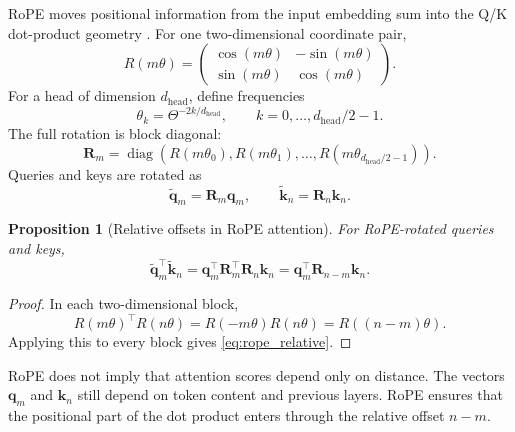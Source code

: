 \documentclass[11pt,a4paper]{article}
\theoremstyle{definition}
\theoremstyle{plain}
\newtheorem{proposition}{Proposition}[section]
\newcommand{\vq}{\bm{q}}
\newcommand{\vk}{\bm{k}}
\newcommand{\mR}{\bm{R}}
\newcommand{\dhead}{d_{\mathrm{head}}}
\DeclareMathOperator{\diag}{diag}
\begin{document}
RoPE moves positional information from the input embedding sum into the Q/K dot-product geometry \cite{su2021roformer}. For one two-dimensional coordinate pair,
\begin{equation}\label{eq:rope_rotation}
    R(m\theta)=
    \begin{pmatrix}
        \cos(m\theta)&-\sin(m\theta)\\
        \sin(m\theta)&\cos(m\theta)
    \end{pmatrix}.
\end{equation}
For a head of dimension $\dhead$, define frequencies
\begin{equation}\label{eq:rope_freqs}
    \theta_k=\Theta^{-2k/\dhead},
    \qquad k=0,\ldots,\dhead/2-1.
\end{equation}
The full rotation is block diagonal:
\begin{equation}
    \mR_m=\diag(R(m\theta_0),R(m\theta_1),\ldots,R(m\theta_{\dhead/2-1})).
\end{equation}
Queries and keys are rotated as
\begin{equation}
    \widetilde{\vq}_m=\mR_m\vq_m,
    \qquad
    \widetilde{\vk}_n=\mR_n\vk_n.
\end{equation}

\begin{proposition}[Relative offsets in RoPE attention]
For RoPE-rotated queries and keys,
\begin{equation}\label{eq:rope_relative}
    \widetilde{\vq}_m^\top\widetilde{\vk}_n
    =\vq_m^\top \mR_m^\top\mR_n\vk_n
    =\vq_m^\top\mR_{n-m}\vk_n.
\end{equation}
\end{proposition}

\begin{proof}
In each two-dimensional block,
\begin{equation}
    R(m\theta)^\top R(n\theta)=R(-m\theta)R(n\theta)=R((n-m)\theta).
\end{equation}
Applying this to every block gives \cref{eq:rope_relative}.
\end{proof}

\begin{warningbox}
RoPE does not imply that attention scores depend only on distance. The vectors $\vq_m$ and $\vk_n$ still depend on token content and previous layers. RoPE ensures that the positional part of the dot product enters through the relative offset $n-m$.
\end{warningbox}
\end{document}

